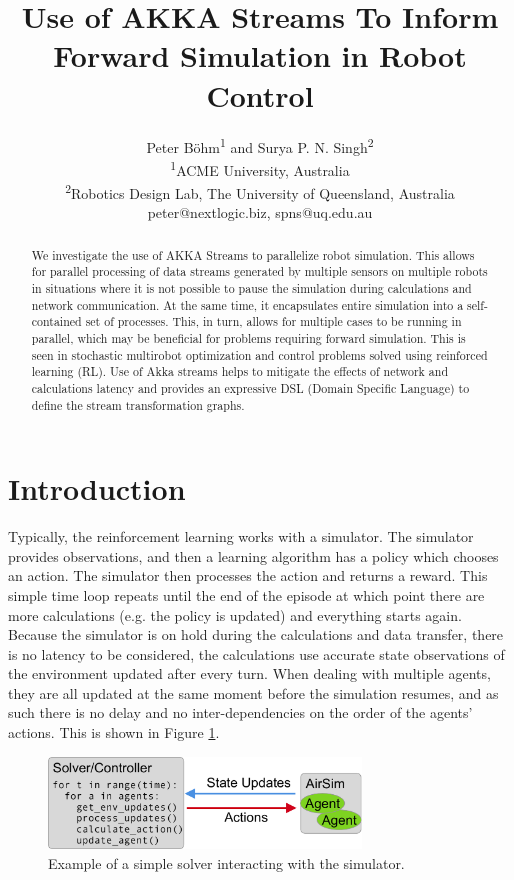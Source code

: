 \documentclass{article}
\title{Use of AKKA Streams To Inform Forward Simulation in Robot Control}
\author{Peter Böhm\textsuperscript{1} and Surya P. N. Singh\textsuperscript{2}\\ \textsuperscript{1}ACME University, Australia\\ 
	\textsuperscript{2}Robotics Design Lab, The University of Queensland, Australia\\
	peter@nextlogic.biz, spns@uq.edu.au}
\begin{document}
\maketitle

\begin{abstract}
We investigate the use of AKKA Streams to parallelize robot simulation. This allows for parallel processing of data streams generated by multiple sensors on multiple robots in situations where it is not possible to pause the simulation during calculations and network communication. At the same time, it encapsulates entire simulation into a self-contained set of processes. This, in turn, allows for multiple cases to be running in parallel, which may be beneficial for problems requiring forward simulation. This is seen in stochastic multirobot optimization and control problems solved using reinforced learning (RL). Use of Akka streams helps to mitigate the effects of network and calculations latency and provides an expressive DSL (Domain Specific Language) to define the stream transformation graphs. 

\end{abstract}

\section{Introduction}
Typically, the reinforcement learning works with a simulator. The simulator provides observations, and then a learning algorithm has a policy which chooses an action. The simulator then processes the action and returns a reward. This simple time loop repeats until the end of the episode at which point there are more calculations (e.g. the policy is updated) and everything starts again. Because the simulator is on hold during the calculations and data transfer, there is no latency to be considered, the calculations use accurate state observations of the environment updated after every turn. When dealing with multiple agents, they are all updated at the same moment before the simulation resumes, and as such there is no delay and no inter-dependencies on the order of the agents' actions. This is shown in Figure \ref{fig:naive-solver}.
\begin{figure}
	\centering
	\includegraphics[width=8.31cm]{naive-solver}
	\caption{Example of a simple solver interacting with the simulator.}\label{fig:naive-solver}
\end{figure}
\end{document}
